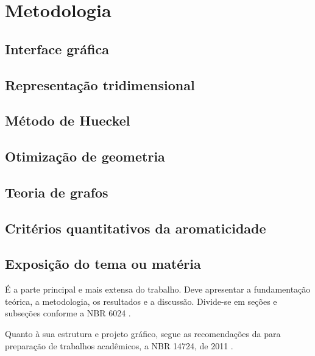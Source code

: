 \chapter{Metodologia
}\label{cap:desenvolvimento}
\section{Interface gráfica}

\section{Representação tridimensional}

\section{Método de Hueckel}

\section{Otimização de geometria}

\section{Teoria de grafos}

\section{Critérios quantitativos da aromaticidade}


\section{Exposição do tema ou matéria}

É a parte principal e mais extensa do trabalho. Deve apresentar a fundamentação teórica, a metodologia, os resultados e a discussão. Divide-se em seções e subseções conforme a NBR 6024 \cite{NBR6024:2012}.

Quanto à sua estrutura e projeto gráfico, segue as recomendações da  para preparação de trabalhos acadêmicos, a NBR 14724, de 2011 \cite{NBR14724:2011}.

